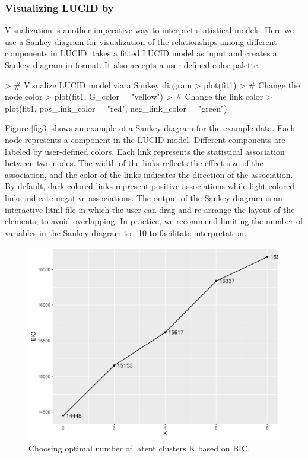 \subsubsection{Visualizing LUCID by } \label{sec3.2.2}
Visualization is another imperative way to interpret statistical models. Here we use a Sankey diagram \citep{schmidt2008sankey} for visualization of the relationships among different components in LUCID.  takes a fitted LUCID model as input and creates a Sankey diagram in  format. It also accepts a user-defined color palette. 
\begin{example}
> # Visualize LUCID model via a Sankey diagram
> plot(fit1)
> # Change the node color
> plot(fit1, G_color = "yellow")
> # Change the link color
> plot(fit1, pos_link_color = "red", neg_link_color = "green")
\end{example}
Figure \ref{fig3} shows an example of a Sankey diagram for the example data. Each node represents a component in the LUCID model. Different components are labeled by user-defined colors. Each link represents the statistical association between two nodes. The width of the links reflects the effect size of the association, and the color of the links indicates the direction of the  association. By default, dark-colored links represent positive associations while light-colored links indicate negative associations. The output of the Sankey diagram is an interactive html file in which the user can drag and re-arrange the layout of the elements, to avoid overlapping. In practice, we recommend limiting the number of variables in the Sankey diagram to ~10 to facilitate interpretation.
\begin{figure}[]
    \centering
    \includegraphics[scale = 0.6]{figures/fig4.pdf}
    \caption{Choosing optimal number of latent clusters K based on BIC.}
    \label{fig4}
\end{figure}
